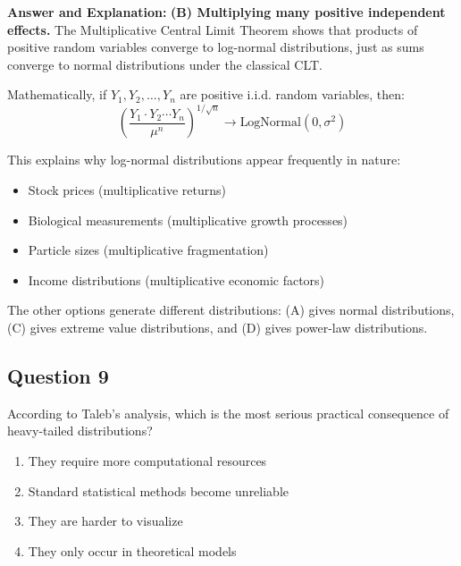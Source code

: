 \documentclass[11pt]{article}
\newenvironment{answer}{\color{answercolor}\begin{framed}\textbf{Answer and Explanation:}}{\end{framed}}
\begin{document}
\begin{answer}
\textbf{(B) Multiplying many positive independent effects.} The Multiplicative Central Limit Theorem shows that products of positive random variables converge to log-normal distributions, just as sums converge to normal distributions under the classical CLT.

Mathematically, if $Y_1, Y_2, \ldots, Y_n$ are positive i.i.d. random variables, then:
$$\left(\frac{Y_1 \cdot Y_2 \cdots Y_n}{\mu^n}\right)^{1/\sqrt{n}} \rightarrow \text{LogNormal}(0, \sigma^2)$$

This explains why log-normal distributions appear frequently in nature:
\begin{itemize}
    \item Stock prices (multiplicative returns)
    \item Biological measurements (multiplicative growth processes)
    \item Particle sizes (multiplicative fragmentation)
    \item Income distributions (multiplicative economic factors)
\end{itemize}

The other options generate different distributions: (A) gives normal distributions, (C) gives extreme value distributions, and (D) gives power-law distributions.
\end{answer}

\subsection{Question 9}
According to Taleb's analysis, which is the most serious practical consequence of heavy-tailed distributions?

\begin{enumerate}[label=(\Alph*)]
    \item They require more computational resources
    \item Standard statistical methods become unreliable
    \item They are harder to visualize
    \item They only occur in theoretical models
\end{enumerate}
\end{document}

